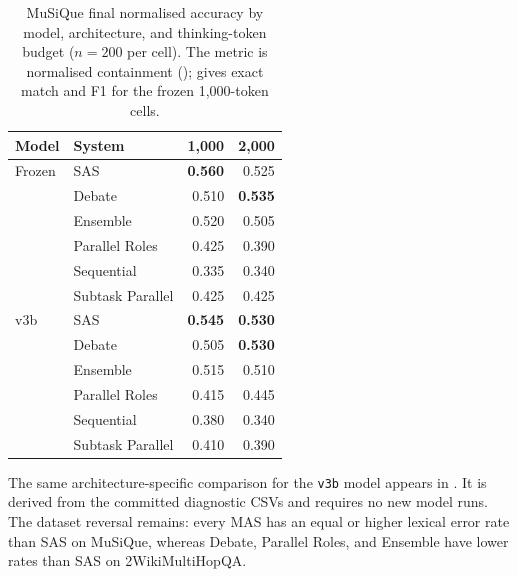 \begin{table}[htbp]
  \centering
  \caption[MuSiQue final normalised accuracy]{MuSiQue final normalised accuracy by model, architecture, and thinking-token budget ($n=200$ per cell). The metric is normalised containment ();  gives exact match and F1 for the frozen 1,000-token cells.}
  \label{tab:musique-lexical}
  \begin{tabular}{@{}llrr@{}}
    \toprule
    Model & System & 1,000 & 2,000 \\
    \midrule
    Frozen & SAS & \textbf{0.560} & 0.525 \\
           & Debate & 0.510 & \textbf{0.535} \\
           & Ensemble & 0.520 & 0.505 \\
           & Parallel Roles & 0.425 & 0.390 \\
           & Sequential & 0.335 & 0.340 \\
           & Subtask Parallel & 0.425 & 0.425 \\
    \addlinespace
    v3b & SAS & \textbf{0.545} & \textbf{0.530} \\
        & Debate & 0.505 & \textbf{0.530} \\
        & Ensemble & 0.515 & 0.510 \\
        & Parallel Roles & 0.415 & 0.445 \\
        & Sequential & 0.380 & 0.340 \\
        & Subtask Parallel & 0.410 & 0.390 \\
    \bottomrule
  \end{tabular}
\end{table}

The same architecture-specific comparison for the \texttt{v3b} model appears in
. It is derived from the committed diagnostic CSVs and requires no new model runs. The dataset reversal remains: every MAS has an equal or higher lexical error rate than SAS on MuSiQue, whereas Debate, Parallel Roles, and Ensemble have lower rates than SAS on 2WikiMultiHopQA.


